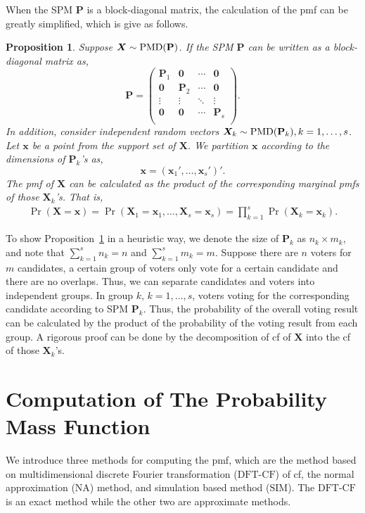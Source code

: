 \documentclass[12pt]{article}
\newcommand{\Pmat}{\mathbf{P}}
\newcommand{\zeromat}{\mathbf{0}}
\newcommand{\PMD}{{\normalfont\textrm{PMD}}}
\newcommand{\Xvec}{\boldsymbol{X}}
\newcommand{\xvec}{\boldsymbol{x}}
\newcommand{\SIM}{{\textrm{SIM}}}
\newcommand{\NA}{{\textrm{NA}}}
\newcommand{\dft}{{\textrm{DFT-CF}}}
\newcommand{\qedw}{\hfill \ensuremath{\Box}}
\newtheorem{ppt}{Proposition}
\begin{document}
When the SPM $\Pmat$ is a block-diagonal matrix, the calculation of the pmf can be greatly simplified, which is give as follows.
\begin{ppt}\label{prop:Pmat.product}
Suppose $\Xvec \sim \PMD(\Pmat)$. If the SPM $\Pmat$ can be written as a block-diagonal matrix as,
$$
\Pmat=
\begin{pmatrix}
  \Pmat_1  & \zeromat & \cdots & \zeromat \\
  \zeromat & \Pmat_2  & \cdots & \zeromat \\
  \vdots   & \vdots   & \ddots & \vdots   \\
  \zeromat & \zeromat & \cdots & \Pmat_s  \\
\end{pmatrix}.
$$
In addition, consider independent random vectors $\Xvec_{k} \sim \PMD(\Pmat_{k}), k=1,\dots,s$. Let $\xvec$ be a point from the support set of $\Xvec$. We partition $\xvec$ according to the dimensions of $\Pmat_k$'s as,
$$\xvec= (\xvec_{1}',\dots,\xvec_{s}')'.$$
The pmf of $\Xvec$ can be calculated as the product of the corresponding marginal pmfs of those $\Xvec_k$'s. That is,
\begin{align*}
\Pr(\Xvec=\xvec)= \Pr(\Xvec_{1}=\xvec_{1}, \dots, \Xvec_{s}=\xvec_{s})= \prod_{k=1}^s \Pr(\Xvec_{k} = \xvec_{k}).
\end{align*}
\end{ppt}

To show Proposition~\ref{prop:Pmat.product} in a heuristic way, we denote the size of $\Pmat_{k}$ as $n_k \times m_k$, and note that $\sum_{k=1}^s n_k = n$ and $\sum_{k=1}^s m_k = m$. Suppose there are $n$ voters for $m$ candidates, a certain group of voters only vote for a certain candidate and there are no overlaps. Thus, we can separate candidates and voters into independent groups. In group $k$, $k = 1,\dots,s$, voters voting for the corresponding candidate according to SPM $\Pmat_{k}$. Thus, the probability of the overall voting result can be calculated by the product of the probability of the voting result from each group. A rigorous proof can be done by the decomposition of cf of $\Xvec$ into the cf of those $\Xvec_k$'s.


\section{Computation of The Probability Mass Function} \label{sec:cmpt.pmf}
We introduce three methods for computing the pmf, which are the method based on multidimensional discrete Fourier transformation ($\dft$) of cf, the normal approximation ($\NA$) method, and simulation based method ($\SIM$). The $\dft$ is an exact method while the other two are approximate methods.
\end{document}
